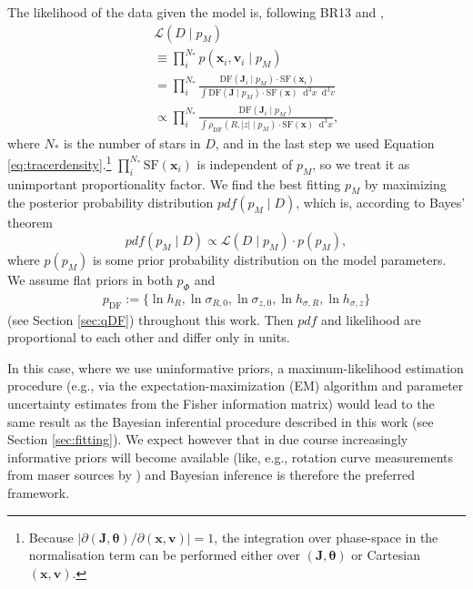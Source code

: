 \documentclass[iop,revtex4,numberedappendix,appendixfloats]{emulateapj}
\newcommand{\vect}[1]{\boldsymbol{#1}}
\newcommand*\Diff[1]{\mathop{}\!\mathrm{d^#1}}
\newcommand{\pdf}{\ensuremath{pdf}}
\newcommand{\pmodel}{\ensuremath{p_M}}
\begin{document}
The likelihood of the data given the model is, following BR13 and \citet{2013MNRAS.433.1411M},
\begin{eqnarray}
&&\mathscr{L}(D \mid \pmodel) \nonumber\\
&&\equiv \prod_i^{N_*} p(\vect{x}_i,\vect{v}_i \mid \pmodel) \nonumber\\
&&= \prod_i^{N_*} \frac{\text{DF}(\vect{J}_i \mid \pmodel) \cdot \text{SF}(\vect{x}_i)}{\int \text{DF}(\vect{J} \mid \pmodel) \cdot \text{SF}(\vect{x}) \Diff 3 x \Diff 3 v}\nonumber\\
&&\propto \prod_i^{N_*} \frac{\text{DF}(\vect{J}_i \mid \pmodel)}{\int \rho_\text{DF}(R,|z| \mid \pmodel) \cdot \text{SF}(\vect{x}) \Diff 3 x}, \label{eq:prob}
\end{eqnarray}
where $N_*$ is the number of stars in $D$, and in the last step we used Equation \eqref{eq:tracerdensity}.\footnote{Because $\left| \partial(\vect{J},\vect{\theta}) / \partial (\vect{x},\vect{v}) \right| = 1$, the integration over phase-space in the normalisation term can be performed either over $(\vect{J},\vect{\theta})$ or Cartesian $(\vect{x},\vect{v})$.} $\prod_i^{N_*}\text{SF}(\vect{x}_i)$ is independent of \pmodel{}, so we treat it as unimportant proportionality factor. We find the best fitting \pmodel{} by maximizing the posterior probability distribution $\pdf{}(\pmodel \mid D)$, which is, according to Bayes' theorem
\begin{equation*}
\pdf{}(\pmodel \mid D) \propto \mathscr{L}(D\mid \pmodel) \cdot p(\pmodel),
\end{equation*}
where $p(\pmodel)$ is some prior probability distribution on the model parameters. We assume flat priors in both $p_\Phi$ and
\begin{eqnarray}
p_\text{DF} := \{ \ln h_R, \ln \sigma_{R,0}, \ln \sigma_{z,0}, \ln h_{\sigma,R}, \ln h_{\sigma,z} \} \label{eq:p_DF}
\end{eqnarray}
(see Section \ref{sec:qDF}) throughout this work. Then \pdf{} and likelihood are proportional to each other and differ only in units.

In this case, where we use uninformative priors, a maximum-likelihood estimation procedure (e.g., via the expectation-maximization (EM) algorithm and parameter uncertainty estimates from the Fisher information matrix) would lead to the same result as the Bayesian inferential procedure described in this work (see Section \ref{sec:fitting}). We expect however that in due course increasingly informative priors will become available (like, e.g., rotation curve measurements from maser sources by \citet{2009ApJ...700..137R}) and Bayesian inference is therefore the preferred framework.
\end{document}
